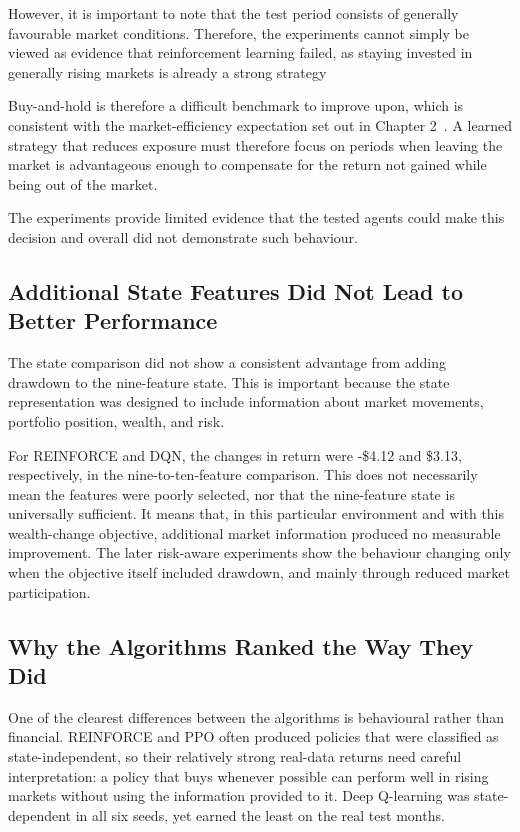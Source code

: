 However, it is important to note that the test period consists of
generally favourable market conditions. Therefore, the experiments
cannot simply be viewed as evidence that reinforcement learning failed,
as staying invested in generally rising markets is already a strong
strategy

Buy-and-hold is therefore a difficult benchmark to improve upon, which is consistent with the market-efficiency expectation set out in Chapter 2~\cite{fama1970}. A
learned strategy that reduces exposure must therefore focus on periods
when leaving the market is advantageous enough to compensate for the
return not gained while being out of the market.

The experiments provide limited evidence that the tested agents could
make this decision and overall did not demonstrate such behaviour.

\subsection{Additional State Features Did Not Lead to Better Performance}

The state comparison did not show a consistent advantage from adding
drawdown to the nine-feature state. This is important because the state
representation was designed to include information about market
movements, portfolio position, wealth, and risk.

For REINFORCE and DQN, the changes in return were -\$4.12 and \$3.13,
respectively, in the nine-to-ten-feature comparison. This does not
necessarily mean the features were poorly selected, nor that the
nine-feature state is universally sufficient. It means that, in this
particular environment and with this wealth-change objective, additional
market information produced no measurable improvement. The later
risk-aware experiments show the behaviour changing only when the
objective itself included drawdown, and mainly through reduced market
participation.

\subsection{Why the Algorithms Ranked the Way They Did}

One of the clearest differences between the algorithms is behavioural
rather than financial. REINFORCE and PPO often produced policies that
were classified as state-independent, so their relatively strong
real-data returns need careful interpretation: a policy that buys
whenever possible can perform well in rising markets without using the
information provided to it. Deep Q-learning was state-dependent in all
six seeds, yet earned the least on the real test months.

